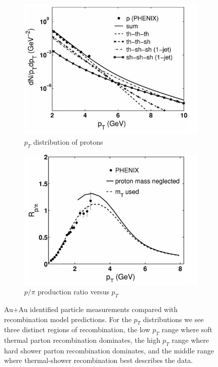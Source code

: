 \begin{figure}
\begin{subfigure}[b]{0.32\textwidth}
    \centering
    \includegraphics[width=\textwidth]{prevplots/pyieldrecomb.JPG}
    \caption{$p_T$ distribution of protons}
    \label{fig:pyieldrecomb}
\end{subfigure}
\begin{subfigure}[b]{0.5\textwidth}
    \centering
    \includegraphics[width=\textwidth]{prevplots/ppiratiorecomb.JPG}
    \caption{$p/\pi$ production ratio versus $p_T$}
    \label{fig:ppiratiorecomb}
\end{subfigure}
\caption[Recombination model compared with Au+Au data]{Au+Au identified particle measurements compared with recombination model predictions. For the $p_T$ distributions we see three distinct regions of recombination, the low $p_T$ range where soft thermal parton recombination dominates, the high $p_T$ range where hard shower parton recombination dominates, and the middle range where thermal-shower recombination best describes the data.}
\label{fig:hwaAAmodels}
\end{figure}

